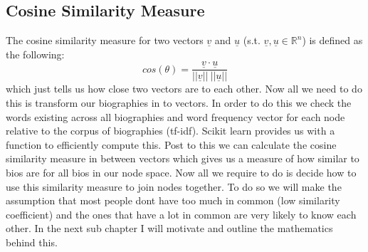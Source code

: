 \documentclass[10pt,twocolumn]{article}
\begin{document}
\subsection{Cosine Similarity Measure}
The cosine similarity measure for two vectors $\underline{v} $ and $\underline{u}$ (s.t. $\underline{v}, \underline{u} \in \mathbb{R}^{n}$) is defined as the following:
\[
cos(\theta) = \frac{\underline{v}\cdot \underline{u}}{||\underline{v}|| \: ||\underline{u}||}
\]
which just tells us how close two vectors are to each other. Now all we need to do this is transform our biographies in to vectors. In order to do this we check the words existing across all biographies and word frequency vector for each node relative to the corpus of biographies (tf-idf). Scikit learn provides us with a function to efficiently compute this. 
\newline\newline
Post to this
we can calculate the cosine similarity measure in between vectors which gives us a measure of how similar to bios are for all bios in our node space.
\newline\newline 
Now all we require to do is decide how to use this similarity measure to join nodes together. To do so we will make the assumption that most people dont have too much in common (low similarity coefficient) and the ones that have a lot in common are very likely to know each other. In the next sub chapter I will motivate and outline the mathematics behind this.
\end{document}
